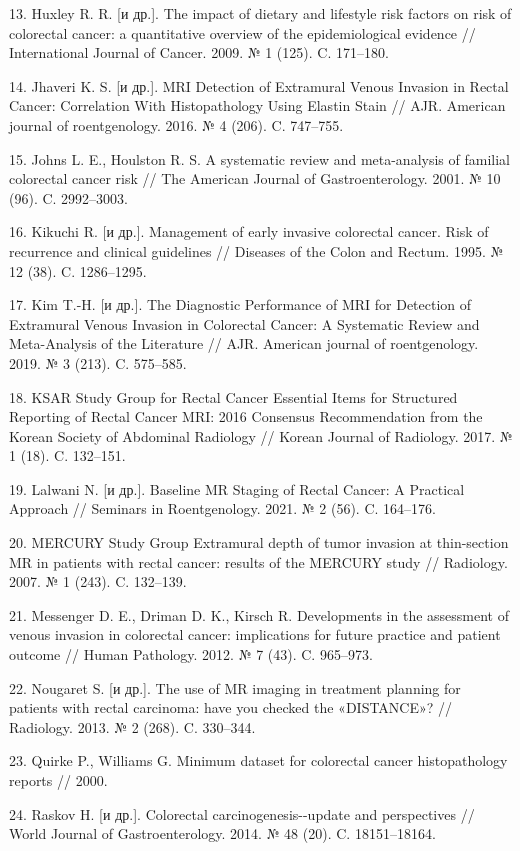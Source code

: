 \documentclass[
  russian,
  12pt,
  a4paper,
]{report}
\begin{document}
13. Huxley R. R. {[}и др.{]}. The impact of dietary and lifestyle risk
factors on risk of colorectal cancer: a quantitative overview of the
epidemiological evidence // International Journal of Cancer. 2009. № 1
(125). C. 171--180.

14. Jhaveri K. S. {[}и др.{]}. MRI Detection of Extramural Venous
Invasion in Rectal Cancer: Correlation With Histopathology Using Elastin
Stain // AJR. American journal of roentgenology. 2016. № 4 (206). C.
747--755.

15. Johns L. E., Houlston R. S. A systematic review and meta-analysis of
familial colorectal cancer risk // The American Journal of
Gastroenterology. 2001. № 10 (96). C. 2992--3003.

16. Kikuchi R. {[}и др.{]}. Management of early invasive colorectal
cancer. Risk of recurrence and clinical guidelines // Diseases of the
Colon and Rectum. 1995. № 12 (38). C. 1286--1295.

17. Kim T.-H. {[}и др.{]}. The Diagnostic Performance of MRI for
Detection of Extramural Venous Invasion in Colorectal Cancer: A
Systematic Review and Meta-Analysis of the Literature // AJR. American
journal of roentgenology. 2019. № 3 (213). C. 575--585.

18. KSAR Study Group for Rectal Cancer Essential Items for Structured
Reporting of Rectal Cancer MRI: 2016 Consensus Recommendation from the
Korean Society of Abdominal Radiology // Korean Journal of Radiology.
2017. № 1 (18). C. 132--151.

19. Lalwani N. {[}и др.{]}. Baseline MR Staging of Rectal Cancer: A
Practical Approach // Seminars in Roentgenology. 2021. № 2 (56). C.
164--176.

20. MERCURY Study Group Extramural depth of tumor invasion at
thin-section MR in patients with rectal cancer: results of the MERCURY
study // Radiology. 2007. № 1 (243). C. 132--139.

21. Messenger D. E., Driman D. K., Kirsch R. Developments in the
assessment of venous invasion in colorectal cancer: implications for
future practice and patient outcome // Human Pathology. 2012. № 7 (43).
C. 965--973.

22. Nougaret S. {[}и др.{]}. The use of MR imaging in treatment planning
for patients with rectal carcinoma: have you checked the «DISTANCE»? //
Radiology. 2013. № 2 (268). C. 330--344.

23. Quirke P., Williams G. Minimum dataset for colorectal cancer
histopathology reports // 2000.

24. Raskov H. {[}и др.{]}. Colorectal carcinogenesis-\/-update and
perspectives // World Journal of Gastroenterology. 2014. № 48 (20). C.
18151--18164.
\end{document}
